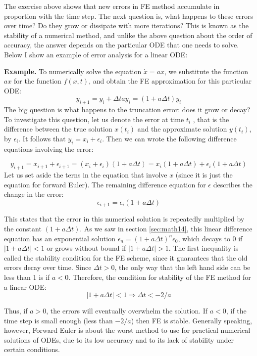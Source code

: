 \documentclass[
  letterpaper,
  DIV=11,
  numbers=noendperiod]{scrreprt}
\begin{document}
The exercise above shows that new errors in FE method accumulate in
proportion with the time step. The next question is, what happens to
these errors over time? Do they grow or dissipate with more iterations?
This is known as the stability of a numerical method, and unlike the
above question about the order of accuracy, the answer depends on the
particular ODE that one needs to solve. Below I show an example of error
analysis for a linear ODE:

\textbf{Example.} To numerically solve the equation \(\dot x = ax\), we
substitute the function \(ax\) for the function \(f(x,t)\), and obtain
the FE approximation for this particular ODE:
\[y_{i+1} = y_i + \Delta t a y_i = (1+a\Delta t) y_i\] The big question
is what happens to the truncation error: does it grow or decay? To
investigate this question, let us denote the error at time \(t_i\) ,
that is the difference between the true solution \(x(t_i)\) and the
approximate solution \(y(t_i)\), by \(\epsilon_i\). It follows that
\(y_i = x_i + \epsilon_i\). Then we can wrote the following difference
equations involving the error:

\[y_{i+1} = x_{i+1} + \epsilon_{i+1} = (x_i + \epsilon_i) (1+a\Delta t)  = x_i (1+a\Delta t) + \epsilon_i(1+a\Delta t)\]
Let us set aside the terns in the equation that involve \(x\) (since it
is just the equation for forward Euler). The remaining difference
equation for \(\epsilon\) describes the change in the error:
\[\epsilon_{i+1} = \epsilon_i(1+a\Delta t) \]

This states that the error in this numerical solution is repeatedly
multiplied by the constant \((1+a\Delta t)\). As we saw in section
\ref{sec:math14}, this linear difference equation has an exponential
solution \(\epsilon_n = (1+a\Delta t)^n \epsilon_0\), which decays to 0
if \(|1+a\Delta t| < 1\) or grows without bound if
\(|1+a\Delta t| > 1\). The first inequality is called the stability
condition for the FE scheme, since it guarantees that the old errors
decay over time. Since \(\Delta t >0\), the only way that the left hand
side can be less than 1 is if \(a<0\). Therefore, the condition for
stability of the FE method for a linear ODE:
\[|1 + a\Delta t| < 1 \Rightarrow \Delta t < -2/a\]

Thus, if \(a>0\), the errors will eventually overwhelm the solution. If
\(a<0\), if the time step is small enough (less than \(-2/a\)) then FE
is stable. Generally speaking, however, Forward Euler is about the worst
method to use for practical numerical solutions of ODEs, due to its low
accuracy and to its lack of stability under certain conditions.
\end{document}
